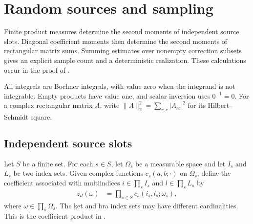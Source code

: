 
\section{Random sources and sampling}\label{ch:random_sources}

Finite product measures determine the second moments of independent source
slots. Diagonal coefficient moments then determine the second moments of
rectangular matrix sums. Summing estimates over nonempty correction subsets
gives an explicit sample count and a deterministic realization.
These calculations occur in the proof of
\cite[Theorem~5.2]{OpenAI2026PolynomialPEPS}.

All integrals are Bochner integrals, with value zero when the integrand is not
integrable. Empty products have value one, and scalar inversion uses
$0^{-1}=0$. For a complex rectangular matrix
$A$, write $\lVert A\rVert_2^2=\sum_{r,c}|A_{rc}|^2$ for its
Hilbert--Schmidt square.

\subsection{Independent source slots}

\begin{definition}\label{def:random_tensor_coefficients}
    \leanok
    Let $S$ be a finite set. For each $s\in S$, let $\Omega_s$ be a measurable
    space and let $I_s$ and $L_s$ be two index sets. Given complex functions
    $c_s(a,b;\cdot)$ on $\Omega_s$, define the coefficient associated with
    multiindices $i\in\prod_s I_s$ and $l\in\prod_s L_s$ by
    \begin{align}
        z_{il}(\omega)
         & =\prod_{s\in S}c_s(i_s,l_s;\omega_s),
        \label{eq:random_tensor_coefficients}
    \end{align}
    where $\omega\in\prod_s\Omega_s$. The ket and bra index sets may have
    different cardinalities.
    This is the coefficient product in
    \cite[Equation~(5.11)]{OpenAI2026PolynomialPEPS}.
\end{definition}

